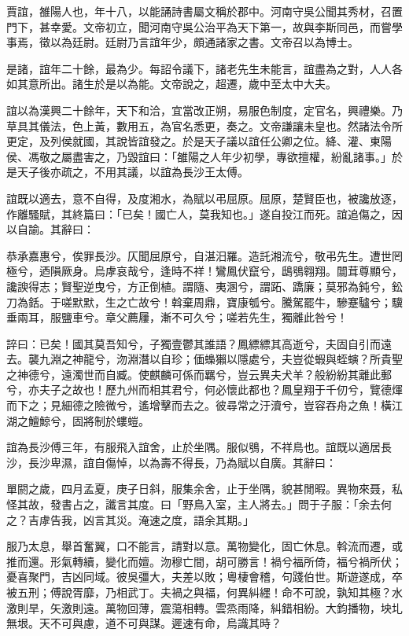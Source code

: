 
\begin{pinyinscope}
賈誼，雒陽人也，年十八，以能誦詩書屬文稱於郡中。河南守吳公聞其秀材，召置門下，甚幸愛。文帝初立，聞河南守吳公治平為天下第一，故與李斯同邑，而嘗學事焉，徵以為廷尉。廷尉乃言誼年少，頗通諸家之書。文帝召以為博士。

是諸，誼年二十餘，最為少。每詔令議下，諸老先生未能言，誼盡為之對，人人各如其意所出。諸生於是以為能。文帝說之，超遷，歲中至太中大夫。

誼以為漢興二十餘年，天下和洽，宜當改正朔，易服色制度，定官名，興禮樂。乃草具其儀法，色上黃，數用五，為官名悉更，奏之。文帝謙讓未皇也。然諸法令所更定，及列侯就國，其說皆誼發之。於是天子議以誼任公卿之位。絳、灌、東陽侯、馮敬之屬盡害之，乃毀誼曰：「雒陽之人年少初學，專欲擅權，紛亂諸事。」於是天子後亦疏之，不用其議，以誼為長沙王太傅。

誼既以適去，意不自得，及度湘水，為賦以弔屈原。屈原，楚賢臣也，被讒放逐，作離騷賦，其終篇曰：「已矣！國亡人，莫我知也。」遂自投江而死。誼追傷之，因以自諭。其辭曰：

恭承嘉惠兮，俟罪長沙。仄聞屈原兮，自湛汨羅。造託湘流兮，敬弔先生。遭世罔極兮，迺隕厥身。烏虖哀哉兮，逢時不祥！鸞鳳伏竄兮，鴟鴞翱翔。闒茸尊顯兮，讒諛得志；賢聖逆曳兮，方正倒植。謂隨、夷溷兮，謂跖、蹻廉；莫邪為鈍兮，鈆刀為銛。于嗟默默，生之亡故兮！斡棄周鼎，寶康瓠兮。騰駕罷牛，驂蹇驢兮；驥垂兩耳，服鹽車兮。章父薦屨，漸不可久兮；嗟若先生，獨離此咎兮！

誶曰：已矣！國其莫吾知兮，子獨壹鬱其誰語？鳳縹縹其高逝兮，夫固自引而遠去。襲九淵之神龍兮，沕淵潛以自珍；偭蟂獺以隱處兮，夫豈從蝦與蛭螾？所貴聖之神德兮，遠濁世而自臧。使麒麟可係而羈兮，豈云異夫犬羊？般紛紛其離此郵兮，亦夫子之故也！歷九州而相其君兮，何必懷此都也？鳳皇翔于千仞兮，覽德煇而下之；見細德之險微兮，遙增擊而去之。彼尋常之汙瀆兮，豈容吞舟之魚！橫江湖之鱣鯨兮，固將制於螻螘。

誼為長沙傅三年，有服飛入誼舍，止於坐隅。服似鴞，不祥鳥也。誼既以適居長沙，長沙卑濕，誼自傷悼，以為壽不得長，乃為賦以自廣。其辭曰：

單閼之歲，四月孟夏，庚子日斜，服集余舍，止于坐隅，貌甚閒暇。異物來聂，私怪其故，發書占之，讖言其度。曰「野鳥入室，主人將去。」問于子服：「余去何之？吉虖告我，凶言其災。淹速之度，語余其期。」

服乃太息，舉首奮翼，口不能言，請對以意。萬物變化，固亡休息。斡流而遷，或推而還。形氣轉續，變化而嬗。沕穆亡間，胡可勝言！禍兮福所倚，福兮禍所伏；憂喜聚門，吉凶同域。彼吳彊大，夫差以敗；粵棲會稽，句踐伯世。斯遊遂成，卒被五刑；傅說胥靡，乃相武丁。夫禍之與福，何異糾纆！命不可說，孰知其極？水激則旱，矢激則遠。萬物回薄，震蕩相轉。雲烝雨降，糾錯相紛。大鈞播物，坱圠無垠。天不可與慮，道不可與謀。遲速有命，烏識其時？


\end{pinyinscope}
